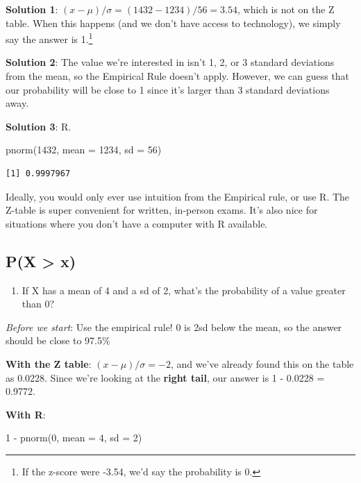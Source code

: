 \documentclass[
  letterpaper,
  DIV=11,
  numbers=noendperiod,
  oneside]{scrreprt}
\newenvironment{Shaded}{\begin{snugshade}}{\end{snugshade}}
\newcommand{\AttributeTok}[1]{\textcolor[rgb]{0.40,0.45,0.13}{#1}}
\newcommand{\DecValTok}[1]{\textcolor[rgb]{0.68,0.00,0.00}{#1}}
\newcommand{\FunctionTok}[1]{\textcolor[rgb]{0.28,0.35,0.67}{#1}}
\newcommand{\NormalTok}[1]{\textcolor[rgb]{0.00,0.23,0.31}{#1}}
\newcommand{\SpecialCharTok}[1]{\textcolor[rgb]{0.37,0.37,0.37}{#1}}
\providecommand{\tightlist}{%
  \setlength{\itemsep}{0pt}\setlength{\parskip}{0pt}}\usepackage{longtable,booktabs,array}
\begin{document}
\textbf{Solution 1}: \((x-\mu)/\sigma = (1432-1234)/56 = 3.54\), which
is not on the Z table. When this happens (and we don't have access to
technology), we simply say the answer is 1.\footnote{If the z-score were
  -3.54, we'd say the probability is 0.}

\textbf{Solution 2}: The value we're interested in isn't 1, 2, or 3
standard deviations from the mean, so the Empirical Rule doesn't apply.
However, we can guess that our probability will be close to 1 since it's
larger than 3 standard deviations away.

\textbf{Solution 3}: R.

\begin{Shaded}
\begin{Highlighting}[]
\FunctionTok{pnorm}\NormalTok{(}\DecValTok{1432}\NormalTok{, }\AttributeTok{mean =} \DecValTok{1234}\NormalTok{, }\AttributeTok{sd =} \DecValTok{56}\NormalTok{)}
\end{Highlighting}
\end{Shaded}

\begin{verbatim}
[1] 0.9997967
\end{verbatim}

Ideally, you would only ever use intuition from the Empirical rule, or
use R. The Z-table is super convenient for written, in-person exams.
It's also nice for situations where you don't have a computer with R
available.

\hypertarget{px-x}{%
\subsection{P(X \textgreater{} x)}\label{px-x}}

\begin{enumerate}
\def\labelenumi{\arabic{enumi}.}
\setcounter{enumi}{2}
\tightlist
\item
  If X has a mean of 4 and a sd of 2, what's the probability of a value
  greater than 0?
\end{enumerate}

\emph{Before we start}: Use the empirical rule! 0 is 2sd below the mean,
so the answer should be close to 97.5\%

\textbf{With the Z table}: \((x-\mu)/\sigma = -2\), and we've already
found this on the table as 0.0228. Since we're looking at the
\textbf{right tail}, our answer is 1 - 0.0228 = 0.9772.

\textbf{With R}:

\begin{Shaded}
\begin{Highlighting}[]
\DecValTok{1} \SpecialCharTok{{-}} \FunctionTok{pnorm}\NormalTok{(}\DecValTok{0}\NormalTok{, }\AttributeTok{mean =} \DecValTok{4}\NormalTok{, }\AttributeTok{sd =} \DecValTok{2}\NormalTok{)}
\end{Highlighting}
\end{Shaded}
\end{document}
